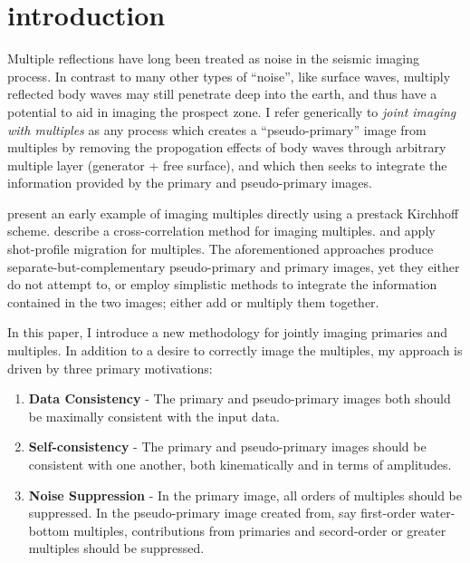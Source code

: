 \section{introduction}
Multiple reflections have long been treated as noise in the seismic imaging process.
In contrast to many other types of ``noise'', like surface waves, multiply reflected 
body waves may still penetrate deep into the earth, and thus have a potential to 
aid in imaging the prospect zone.  I refer generically to {\em joint imaging with multiples} 
as any process which creates a ``pseudo-primary'' image from multiples by removing the 
propogation effects of body waves through arbitrary multiple layer (generator + free 
surface), and which then seeks to integrate the information provided by the primary 
and pseudo-primary images.
\par
{} present an early example of imaging multiples directly 
using a prestack Kirchhoff scheme.   describe a 
cross-correlation method for imaging multiples.   and
 apply shot-profile migration for multiples.
The aforementioned approaches produce separate-but-complementary pseudo-primary and primary 
images, yet they either do not attempt to, or employ simplistic methods to integrate the information
contained in the two images; either add \cite{GEO56-07-10811086} or multiply \cite{SEG-2001-04560459} 
them together.
\par
In this paper, I introduce a new methodology for jointly imaging primaries and multiples.
In addition to a desire to correctly image the multiples, my approach is driven by three 
primary motivations:
\begin{enumerate}
	\item {\bf Data Consistency} - The primary and pseudo-primary images both should be
		maximally consistent with the input data.
	\item {\bf Self-consistency} - The primary and pseudo-primary images should be consistent
		with one another, both kinematically and in terms of amplitudes. 
	\item {\bf Noise Suppression} - In the primary image, all orders of multiples should be
		suppressed.  In the pseudo-primary image created from, say first-order water-bottom 
		multiples, contributions from primaries and secord-order or greater multiples should be 
		suppressed.
\end{enumerate}

